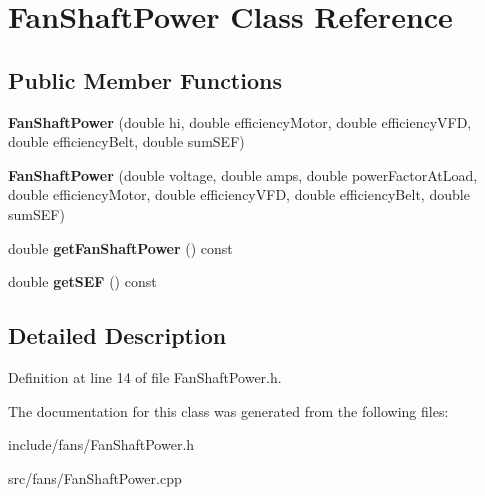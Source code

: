 \hypertarget{class_fan_shaft_power}{}\section{Fan\+Shaft\+Power Class Reference}
\label{class_fan_shaft_power}
\subsection*{Public Member Functions}
\begin{DoxyCompactItemize}
\item 
\mbox{\label{class_fan_shaft_power_af18640c7d8b2bb7dbb7c4e2a1fb2c671}} 
{\bfseries Fan\+Shaft\+Power} (double hi, double efficiency\+Motor, double efficiency\+V\+FD, double efficiency\+Belt, double sum\+S\+EF)
\item 
\mbox{\label{class_fan_shaft_power_a081d29516dab74f7f01bf72f1154c10c}} 
{\bfseries Fan\+Shaft\+Power} (double voltage, double amps, double power\+Factor\+At\+Load, double efficiency\+Motor, double efficiency\+V\+FD, double efficiency\+Belt, double sum\+S\+EF)
\item 
\mbox{\label{class_fan_shaft_power_a755745b0206e0a957168f6399a4ac438}} 
double {\bfseries get\+Fan\+Shaft\+Power} () const
\item 
\mbox{\label{class_fan_shaft_power_a7a36d22c2301d3c634fc89e103daa148}} 
double {\bfseries get\+S\+EF} () const
\end{DoxyCompactItemize}


\subsection{Detailed Description}


Definition at line 14 of file Fan\+Shaft\+Power.\+h.



The documentation for this class was generated from the following files\+:\begin{DoxyCompactItemize}
\item 
include/fans/Fan\+Shaft\+Power.\+h\item 
src/fans/Fan\+Shaft\+Power.\+cpp\end{DoxyCompactItemize}
